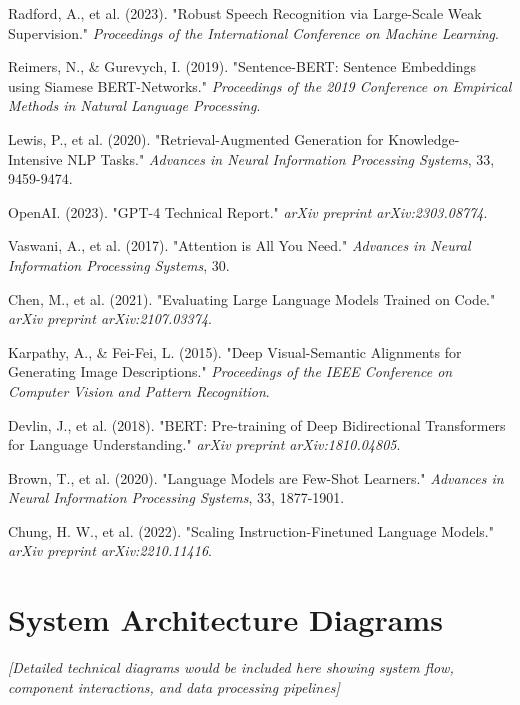 \documentclass{bscs}
\begin{document}
\begin{thebibliography}{10}

Radford, A., et al. (2023). "Robust Speech Recognition via Large-Scale Weak Supervision." \textit{Proceedings of the International Conference on Machine Learning}.

Reimers, N., \& Gurevych, I. (2019). "Sentence-BERT: Sentence Embeddings using Siamese BERT-Networks." \textit{Proceedings of the 2019 Conference on Empirical Methods in Natural Language Processing}.

Lewis, P., et al. (2020). "Retrieval-Augmented Generation for Knowledge-Intensive NLP Tasks." \textit{Advances in Neural Information Processing Systems}, 33, 9459-9474.

OpenAI. (2023). "GPT-4 Technical Report." \textit{arXiv preprint arXiv:2303.08774}.

Vaswani, A., et al. (2017). "Attention is All You Need." \textit{Advances in Neural Information Processing Systems}, 30.

Chen, M., et al. (2021). "Evaluating Large Language Models Trained on Code." \textit{arXiv preprint arXiv:2107.03374}.

Karpathy, A., \& Fei-Fei, L. (2015). "Deep Visual-Semantic Alignments for Generating Image Descriptions." \textit{Proceedings of the IEEE Conference on Computer Vision and Pattern Recognition}.

Devlin, J., et al. (2018). "BERT: Pre-training of Deep Bidirectional Transformers for Language Understanding." \textit{arXiv preprint arXiv:1810.04805}.

Brown, T., et al. (2020). "Language Models are Few-Shot Learners." \textit{Advances in Neural Information Processing Systems}, 33, 1877-1901.

Chung, H. W., et al. (2022). "Scaling Instruction-Finetuned Language Models." \textit{arXiv preprint arXiv:2210.11416}.

\end{thebibliography}

\appendix

\chapter{System Architecture Diagrams}

\textit{[Detailed technical diagrams would be included here showing system flow, component interactions, and data processing pipelines]}
\end{document}
